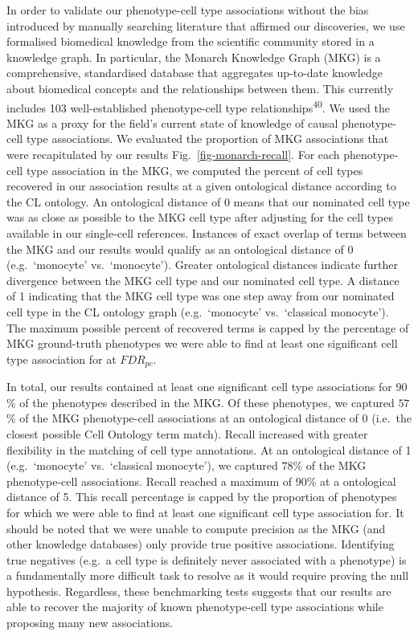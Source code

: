 \documentclass[
]{article}
\begin{document}
In order to validate our phenotype-cell type associations without the
bias introduced by manually searching literature that affirmed our
discoveries, we use formalised biomedical knowledge from the scientific
community stored in a knowledge graph. In particular, the Monarch
Knowledge Graph (MKG) is a comprehensive, standardised database that
aggregates up-to-date knowledge about biomedical concepts and the
relationships between them. This currently includes 103 well-established
phenotype-cell type relationships\textsuperscript{40}. We used the MKG
as a proxy for the field's current state of knowledge of causal
phenotype-cell type associations. We evaluated the proportion of MKG
associations that were recapitulated by our results
Fig.~\ref{fig-monarch-recall}. For each phenotype-cell type association
in the MKG, we computed the percent of cell types recovered in our
association results at a given ontological distance according to the CL
ontology. An ontological distance of 0 means that our nominated cell
type was as close as possible to the MKG cell type after adjusting for
the cell types available in our single-cell references. Instances of
exact overlap of terms between the MKG and our results would qualify as
an ontological distance of 0 (e.g.~`monocyte' vs.~`monocyte'). Greater
ontological distances indicate further divergence between the MKG cell
type and our nominated cell type. A distance of 1 indicating that the
MKG cell type was one step away from our nominated cell type in the CL
ontology graph (e.g.~`monocyte' vs.~`classical monocyte'). The maximum
possible percent of recovered terms is capped by the percentage of MKG
ground-truth phenotypes we were able to find at least one significant
cell type association for at \(FDR_{pc}\).

In total, our results contained at least one significant cell type
associations for \(90\)\% of the phenotypes described in the MKG. Of
these phenotypes, we captured \(57\)\% of the MKG phenotype-cell
associations at an ontological distance of 0 (i.e.~the closest possible
Cell Ontology term match). Recall increased with greater flexibility in
the matching of cell type annotations. At an ontological distance of 1
(e.g.~`monocyte' vs.~`classical monocyte'), we captured \(78\)\% of the
MKG phenotype-cell associations. Recall reached a maximum of \(90\)\% at
a ontological distance of 5. This recall percentage is capped by the
proportion of phenotypes for which we were able to find at least one
significant cell type association for. It should be noted that we were
unable to compute precision as the MKG (and other knowledge databases)
only provide true positive associations. Identifying true negatives
(e.g.~a cell type is definitely never associated with a phenotype) is a
fundamentally more difficult task to resolve as it would require proving
the null hypothesis. Regardless, these benchmarking tests suggests that
our results are able to recover the majority of known phenotype-cell
type associations while proposing many new associations.
\end{document}
